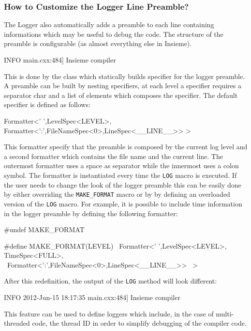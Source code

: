 \subsubsection{How to Customize the Logger Line Preamble?}

The Logger also automatically adds a preamble to each line containing
informations which may be useful to debug the code. The structure of the
preamble is configurable (as almost everything else in Insieme). 

\begin{srcCode}
INFO  main.cxx:484] Insieme compiler
\end{srcCode}

This is done by the  class which statically builds
specifier for the logger preamble. A preamble can be built by nesting
specifiers, at each level a specifier requires a separator char and a list of
elements which composes the specifier. The default specifier is defined as
follows:

\begin{srcCode}
Formatter<' ',LevelSpec<LEVEL>,
	Formatter<':',FileNameSpec<0>,LineSpec<__LINE__>>
>
\end{srcCode}

This formatter specify that the preamble is composed by the current log level
and a second formatter which contains the file name and the current line. The
outermost formatter uses a space as separator while the innermost uses a colon
symbol. The formatter is instantiated every time the {\tt LOG} macro is
executed. If the user needs to change the look of the logger preamble this can
be easily done by either overriding the {\tt MAKE\_FORMAT} macro or by by
defining an overloaded version of the {\tt LOG} macro. For example, it is
possible to include time information in the logger preamble by defining the
following formatter:

\begin{srcCode}
#undef MAKE_FORMAT

#define MAKE_FORMAT(LEVEL) \
Formatter<' ',LevelSpec<LEVEL>, TimeSpec<FULL>, \
	Formatter<':',FileNameSpec<0>,LineSpec<__LINE__>> \
>
\end{srcCode}

After this redefinition, the output of the {\tt LOG} method will look different:
\begin{srcCode}
INFO  2012-Jun-15 18:17:35 main.cxx:484] Insieme compiler
\end{srcCode}

This feature can be used to define loggers which include, in the case of
multi-threaded code, the thread ID in order to simplify debugging of the
compiler code.



